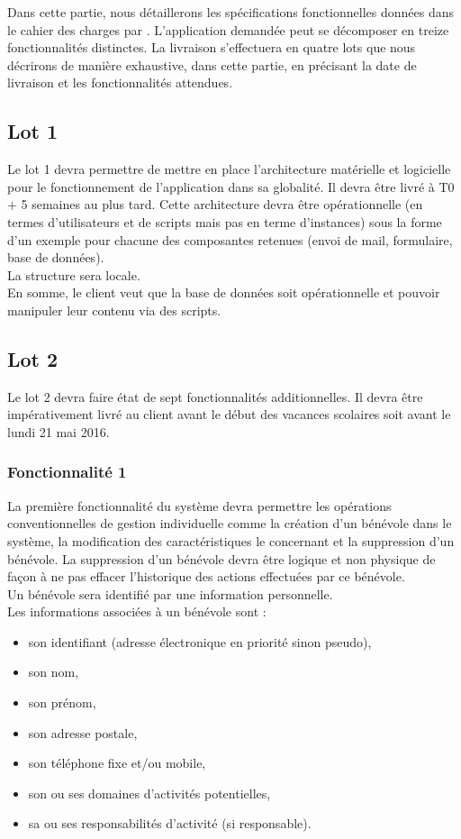 \label{spec_fonct}
Dans cette partie, nous détaillerons les spécifications fonctionnelles données dans le cahier des charges par \nomClient. 
L'application demandée peut se décomposer en treize fonctionnalités distinctes. La livraison s'effectuera en quatre lots que nous décrirons de manière exhaustive, dans cette partie, en précisant la date de livraison et les fonctionnalités attendues. 

\subsection{Lot 1}

Le lot 1 devra permettre de mettre en place l'architecture matérielle et logicielle pour le fonctionnement de l'application dans sa globalité.
 Il devra être livré à T0 + 5 semaines au plus tard. Cette architecture devra être opérationnelle (en termes d'utilisateurs et de scripts mais pas en terme d'instances) sous la forme d'un exemple pour chacune des composantes retenues (envoi de mail, formulaire, base de données). \\
La structure sera locale.\\
En somme, le client veut que la base de données soit opérationnelle et pouvoir manipuler leur contenu via des scripts.
\\


\subsection{Lot 2}
Le lot 2 devra faire état de sept fonctionnalités additionnelles. Il devra être impérativement livré au client avant le début des vacances scolaires soit avant le lundi 21 mai 2016.

\subsubsection{Fonctionnalité 1}
La première fonctionnalité du système devra permettre les opérations conventionnelles de gestion individuelle comme la création d'un bénévole dans le système, la modification des caractéristiques le concernant et la suppression d'un bénévole. La suppression d'un bénévole devra être logique et non physique de façon à ne pas effacer l'historique des actions effectuées par ce bénévole. \\
Un bénévole sera identifié par une information personnelle.\\ 
Les informations associées à un bénévole sont :
\begin{itemize}
\item son identifiant (adresse électronique en priorité sinon pseudo),
\item son nom,
\item son prénom,
\item son adresse postale,
\item son téléphone fixe et/ou mobile,
\item son ou ses domaines d'activités potentielles,
\item sa ou ses responsabilités d'activité (si responsable).\\
\end{itemize}

